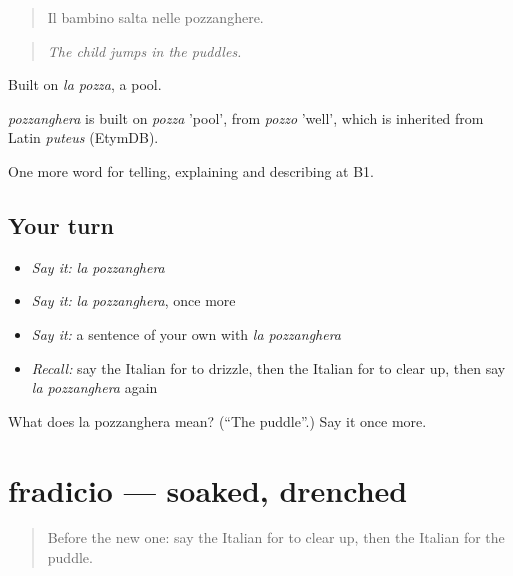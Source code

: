 \begin{quote}
Il bambino salta nelle pozzanghere.
\end{quote}

\begin{quote}
\emph{The child jumps in the puddles.}
\end{quote}

Built on \emph{la pozza}, a pool.

\begin{cousinweb}
\emph{pozzanghera} is built on \emph{pozza} 'pool', from \emph{pozzo} 'well', which is inherited from Latin \emph{puteus} (EtymDB).
\end{cousinweb}

\begin{grammarlens}[title={What you've built}]
One more word for telling, explaining and describing at B1.
\end{grammarlens}

\subsection*{Your turn}
\begin{itemize}
\raggedright
  \item \emph{Say it:} \emph{la pozzanghera}
  \item \emph{Say it:} \emph{la pozzanghera}, once more
  \item \emph{Say it:} a sentence of your own with \emph{la pozzanghera}
  \item \emph{Recall:} say the Italian for to drizzle, then the Italian for to clear up, then say \emph{la pozzanghera} again
\end{itemize}

\begin{tcolorbox}[breakable,colback=teal!4,colframe=teal!35!black,title={Before you move on}]
What does la pozzanghera mean? (\textquotedblleft{}The puddle\textquotedblright{}.) Say it once more.
\end{tcolorbox}
\section[fradicio]{fradicio — soaked, drenched}

\label{lesson:IT-C470-fradicio}



\begin{quote}
Before the new one: say the Italian for to clear up, then the Italian for the puddle.
\end{quote}

